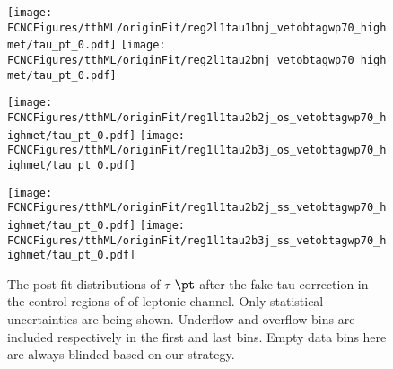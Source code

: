 \begin{figure}[H]
\centering
\caption{ The post-fit distributions of $\tau$ $\pt$  after the fake tau correction in the control regions of of leptonic channel. Only statistical uncertainties are being shown. Underflow and overflow bins are included respectively in the first and last bins. Empty data bins here are always blinded based on our strategy.}
\texttt{[image: \\FCNCFigures/tthML/originFit/reg2l1tau1bnj\_vetobtagwp70\_highmet/tau\_pt\_0.pdf]}
\texttt{[image: \\FCNCFigures/tthML/originFit/reg2l1tau2bnj\_vetobtagwp70\_highmet/tau\_pt\_0.pdf]}

\texttt{[image: \\FCNCFigures/tthML/originFit/reg1l1tau2b2j\_os\_vetobtagwp70\_highmet/tau\_pt\_0.pdf]}
\texttt{[image: \\FCNCFigures/tthML/originFit/reg1l1tau2b3j\_os\_vetobtagwp70\_highmet/tau\_pt\_0.pdf]}

\texttt{[image: \\FCNCFigures/tthML/originFit/reg1l1tau2b2j\_ss\_vetobtagwp70\_highmet/tau\_pt\_0.pdf]}
\texttt{[image: \\FCNCFigures/tthML/originFit/reg1l1tau2b3j\_ss\_vetobtagwp70\_highmet/tau\_pt\_0.pdf]}
\label{fig:wjet_pt_postfit_CR}
\end{figure}
